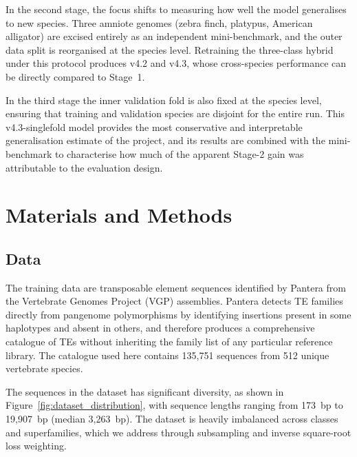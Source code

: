\documentclass[12pt]{article}
\begin{document}
In the second stage, the focus shifts to measuring how well the model generalises to new species. Three amniote genomes (zebra finch, platypus, American alligator) are excised entirely as an independent mini-benchmark, and the outer data split is reorganised at the species level. Retraining the three-class hybrid under this protocol produces v4.2 and v4.3, whose cross-species performance can be directly compared to Stage~1.

In the third stage the inner validation fold is also fixed at the species level, ensuring that training and validation species are disjoint for the entire run. This v4.3-singlefold model provides the most conservative and interpretable generalisation estimate of the project, and its results are combined with the mini-benchmark to characterise how much of the apparent Stage-2 gain was attributable to the evaluation design. 

\newpage
\section{Materials and Methods}\label{sec:methods}

\subsection{Data}\label{ssec:data}

The training data are transposable element sequences identified by Pantera \cite{sierra2024pantera} from the Vertebrate Genomes Project (VGP) assemblies. Pantera detects TE families directly from pangenome polymorphisms by identifying insertions present in some haplotypes and absent in others, and therefore produces a comprehensive catalogue of TEs without inheriting the family list of any particular reference library. The catalogue used here contains 135{,}751 sequences from 512 unique vertebrate species. 

The sequences in the dataset has significant diversity, as shown in Figure~\ref{fig:dataset_distribution}, with sequence lengths ranging from 173~bp to 19{,}907~bp (median 3{,}263~bp). The dataset is heavily imbalanced across classes and superfamilies, which we address through subsampling and inverse square-root loss weighting. 
\end{document}
